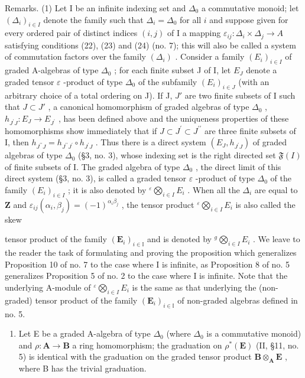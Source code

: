 Remarks. (1) Let I be an infinite indexing set and \(\Delta_0\) a commutative monoid; let \((\Delta_i)_{i \in I}\) denote the family such that \(\Delta_i = \Delta_0\) for all \(i\) and suppose given for every ordered pair of distinct indices \((i,j)\) of I a mapping \(\varepsilon_{ij} : \Delta_i \times \Delta_j \to A\) satisfying conditions (22), (23) and (24) (no. 7); this will also be called a system of commutation factors over the family \((\Delta_i)\) . Consider a family \((E_i)_{i \in I}\) of graded A-algebras of type \(\Delta_0\) ; for each finite subset J of I, let \(E_J\) denote a graded tensor \(\varepsilon\) -product of type \(\Delta_0\) of the subfamily \((E_i)_{i \in J}\) (with an arbitrary choice of a total ordering on J). If J, \(J'\) are two finite subsets of I such that \(J \subset J'\) , a canonical homomorphism of graded algebras of type \(\Delta_0\) , \(h_{J^{\prime}J}:E_{J}\to E_{J^{\prime}}\) , has been defined above and the uniqueness properties of these homomorphisms show immediately that if \(J\subset J^{\prime}\subset J^{\prime\prime}\) are three finite subsets of I, then \(h_{J^{\prime\prime}J}=h_{J^{\prime\prime}J^{\prime}}\circ h_{J^{\prime}J}\) . Thus there is a direct system \((E_{J},h_{J^{\prime}J})\) of graded algebras of type \(\Delta_{0}\) (§3, no. 3), whose indexing set is the right directed set \(\mathfrak{F}(I)\) of finite subsets of I. The graded algebra of type \(\Delta_{0}\) , the direct limit of this direct system (§3, no. 3), is called a graded tensor \(\varepsilon\) -product of type \(\Delta_{0}\) of the family \((E_{i})_{i\in I}\) ; it is also denoted by \({}^{\varepsilon}\bigotimes_{i\in I}E_{i}\) . When all the \(\Delta_{i}\) are equal to \(\mathbf{Z}\) and \(\varepsilon_{ij}(\alpha_{i},\beta_{j})=(-1)^{\alpha_{i}\beta_{j}}\) , the tensor product \({}^{\varepsilon}\bigotimes_{i\in I}E_{i}\) is also called the skew

tensor product of the family \((\mathbf{E}_{i})_{i\in\mathbb{I}}\) and is denoted by \({}^{g}\bigotimes_{i\in I}E_{i}\) . We leave to the reader the task of formulating and proving the proposition which generalizes Proposition 10 of no. 7 to the case where I is infinite, as Proposition 8 of no. 5 generalizes Proposition 5 of no. 2 to the case where I is infinite. Note that the underlying A-module of \({}^{\varepsilon}\bigotimes_{i\in I}E_{i}\) is the same as that underlying the (non-graded) tensor product of the family \((\mathbf{E}_{i})_{i\in\mathbb{I}}\) of non-graded algebras defined in no. 5.

\begin{enumerate}
\def\labelenumi{(\arabic{enumi})}
\setcounter{enumi}{1}
\tightlist
\item
  Let E be a graded A-algebra of type \(\Delta_0\) (where \(\Delta_0\) is a commutative monoid) and \(\rho: \mathbf{A} \to \mathbf{B}\) a ring homomorphism; the graduation on \(\rho^*(\mathbf{E})\) (II, §11, no. 5) is identical with the graduation on the graded tensor product \(\mathbf{B} \otimes_{\mathbf{A}} \mathbf{E}\) , where B has the trivial graduation.
\end{enumerate}
